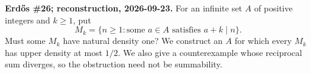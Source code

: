 \textbf{Erd\H{o}s \#26; reconstruction, 2026-09-23.}
For an infinite set $A$ of positive integers and $k\geq1$, put
\[
 M_k=\{n\geq1:\text{some }a\in A\text{ satisfies }a+k\mid n\}.
\]
Must some $M_k$ have natural density one? We construct an $A$ for which
every $M_k$ has upper density at most $1/2$. We also give a counterexample
whose reciprocal sum diverges, so the obstruction need not be summability.
